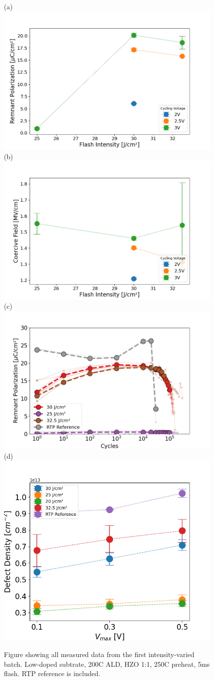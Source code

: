 \documentclass[11pt]{article}
\begin{document}
    \begin{figure}[ht!]
        \centering
        (a)\includegraphics[width=.45\textwidth]{../Fig/InAsFlashIntC/PrTrends_FlashIntC.png}
        (b)\includegraphics[width=.45\textwidth]{../Fig/InAsFlashIntC/EcTrends_FlashIntC.png}
        (c)\includegraphics[width=.45\textwidth]{../Fig/InAsFlashIntC/EnduSpaghetti_FlashIntC.png}
        (d)\includegraphics[width=.45\textwidth]{../Fig/InAsFlashIntC/DDTrend_FlashIntC.png}
        \caption{Figure showing all measured data from the first intensity-varied batch. Low-doped subtrate, 200C ALD, HZO 1:1, 250C preheat, 5ms flash. RTP reference is included.}\label{fig:res_FlashIntC}
    \end{figure}
\end{document}
